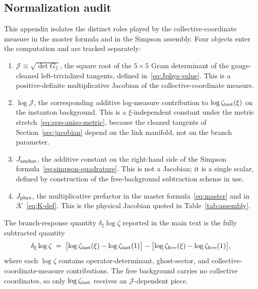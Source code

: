 \documentclass[a4paper,11pt]{article}
\theoremstyle{definition}
\newcommand{\Jphys}{J_{\rm phys}}
\begin{document}
\subsection{Normalization audit}
\label{app:normalization-audit}

This appendix isolates the distinct roles played by the collective-coordinate measure in the master formula and in the Simpson assembly. Four objects enter the computation and are tracked separately:
\begin{enumerate}
\item[(N1)] $\mathcal{J} \equiv \sqrt{\det G_5}$, the square root of the $5\times 5$ Gram determinant of the gauge-cleaned left-trivialized tangents, defined in~\eqref{eq:Jphys-value}. This is a positive-definite multiplicative Jacobian of the collective-coordinate measure.
\item[(N2)] $\log\mathcal{J}$, the corresponding additive log-measure contribution to $\log\zeta_{\rm inst}(\xi)$ on the instanton background. This is a $\xi$-independent constant under the metric stretch~\eqref{eq:app-aniso-metric}, because the cleaned tangents of Section~\ref{sec:jacobian} depend on the link manifold, not on the branch parameter.
\item[(N3)] $J_{\rm anchor}$, the additive constant on the right-hand side of the Simpson formula~\eqref{eq:simpson-quadrature}. This is not a Jacobian; it is a single scalar, defined by construction of the free-background subtraction scheme in use.
\item[(N4)] $\Jphys$, the multiplicative prefactor in the master formula~\eqref{eq:master} and in $\mathcal{K}$~\eqref{eq:K-def}. This is the physical Jacobian quoted in Table~\ref{tab:assembly}.
\end{enumerate}

The branch-response quantity $\delta_\xi\log\zeta$ reported in the main text is the fully subtracted quantity
\begin{equation}
\delta_\xi\log\zeta \;=\; \bigl[\log\zeta_{\rm inst}(\xi) - \log\zeta_{\rm inst}(1)\bigr] - \bigl[\log\zeta_{\rm free}(\xi) - \log\zeta_{\rm free}(1)\bigr],
\label{eq:app-subtraction}
\end{equation}
where each $\log\zeta$ contains operator-determinant, ghost-sector, and collective-coordinate-measure contributions. The free background carries no collective coordinates, so only $\log\zeta_{\rm inst}$ receives an $\mathcal{J}$-dependent piece.
\end{document}
